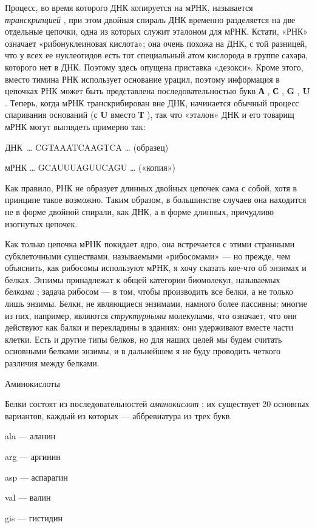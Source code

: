 Процесс, во время которого ДНК копируется на мРНК, называется \emph{транскрипцией} , при этом двойная спираль ДНК временно разделяется на две отдельные цепочки, одна из которых служит эталоном для мРНК. Кстати, «РНК» означает «рибонуклеиновая кислота»; она очень похожа на ДНК, с той разницей, что у всех ее нуклеотидов есть тот специальный атом кислорода в группе сахара, которого нет в ДНК. Поэтому здесь опущена приставка «дезокси». Кроме этого, вместо тимина РНК использует основание урацил, поэтому информация в цепочках РНК может быть представлена последовательностью букв \textbf{А} , \textbf{С} , \textbf{G} , \textbf{U} . Теперь, когда мРНК транскрибирован вне ДНК, начинается обычный процесс спаривания оснований (с \textbf{U} вместо \textbf{Т} ), так что «эталон» ДНК и его товарищ мРНК могут выглядеть примерно так:

ДНК~\ldots{} CGTAAATCAAGTCA \ldots{} (образец)

мРНК \ldots{} GCAUUUAGUUCAGU \ldots{} («копия»)

Как правило, РНК не образует длинных двойных цепочек сама с собой, хотя в принципе такое возможно. Таким образом, в большинстве случаев она находится не в форме двойной спирали, как ДНК, а в форме длинных, причудливо изогнутых цепочек.

Как только цепочка мРНК покидает ядро, она встречается с этими странными субклеточными существами, называемыми «рибосомами» --- но прежде, чем объяснить, как рибосомы используют мРНК, я хочу сказать кое-что об энзимах и белках. Энзимы принадлежат к общей категории биомолекул, называемых \emph{белками} ; задача рибосом --- в том, чтобы производить все белки, а не только лишь энзимы. Белки, не являющиеся энзимами, намного более пассивны; многие из них, например, являются \emph{структурными} молекулами, что означает, что они действуют как балки и перекладины в зданиях: они удерживают вместе части клетки. Есть и другие типы белков, но для наших целей мы будем считать основными белками энзимы, и в дальнейшем я не буду проводить четкого различия между белками.

Аминокислоты

Белки состоят из последовательностей \emph{аминокислот} ; их существует 20 основных вариантов, каждый из которых --- аббревиатура из трех букв.

ala --- аланин

arg --- аргинин

asp --- аспарагин

val --- валин

gis --- гистидин

